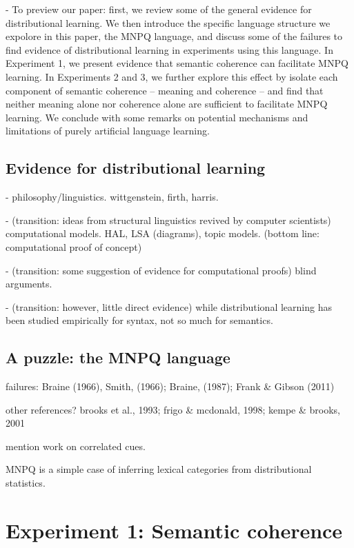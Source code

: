 \documentclass[man,floatsintext]{apa6}
\begin{document}
- To preview our paper: first, we review some of the general evidence for distributional learning. We then introduce the specific language structure we expolore in this paper, the MNPQ language, and discuss some of the failures to find evidence of distributional learning in experiments using this language. In Experiment 1, we present evidence that semantic coherence can facilitate MNPQ learning. In Experiments 2 and 3, we further explore this effect by isolate each component of semantic coherence -- meaning and coherence -- and find that neither meaning alone nor coherence alone are sufficient to facilitate MNPQ learning. We conclude with some remarks on potential mechanisms and limitations of purely artificial language learning.

\subsection{Evidence for distributional learning}

- philosophy/linguistics. wittgenstein, firth, harris.

- (transition: ideas from structural linguistics revived by computer scientists) computational models. HAL, LSA (diagrams), topic models. (bottom line: computational proof of concept)

- (transition: some suggestion of evidence for computational proofs) blind arguments.

- (transition: however, little direct evidence) while distributional learning has been studied empirically for syntax, not so much for semantics.

\subsection{A puzzle: the MNPQ language}

failures: Braine (1966), Smith, (1966); Braine, (1987); Frank \& Gibson (2011)

other references? brooks et al., 1993; frigo \& mcdonald, 1998; kempe \& brooks, 2001

mention work on correlated cues.

MNPQ is a simple case of inferring lexical categories from distributional statistics.

\section{Experiment 1: Semantic coherence}
\end{document}
